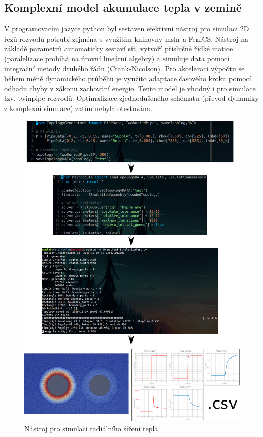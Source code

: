 \subsection*{Komplexní model akumulace tepla v zemině}
V programovacím jazyce python byl sestaven efektivní nástroj pro simulaci 2D
řezů rozvodů potrubí zejména s využitím knihovny mshr a FeniCS. Nástroj na
základě parametrů automaticky sestaví síť, vytvoří příslušné řídké matice
(paralelizace probíhá na úrovní lineární algebry) a simuluje data pomocí
integrační metody druhého řádu (Crank-Nicolson). Pro akceleraci výpočtu se
během méně dynamického průběhu je využito adaptace časového kroku pomocí odhadu
chyby v zákonu zachování energie. Tento model je vhodný i pro simulace tzv.
twinpipe rozvodů. Optimalizace zjednodušeného schématu (převod dynamiky z
komplexní simulace) zatím nebyla otestována.

\begin{figure}[h]
\begin{center}
  \includegraphics[scale=0.65]{figures/fenics_sim_pipes}
\end{center}
\caption{Nástroj pro simulaci radiálního šíření tepla}
\label{fig:}
\end{figure}
